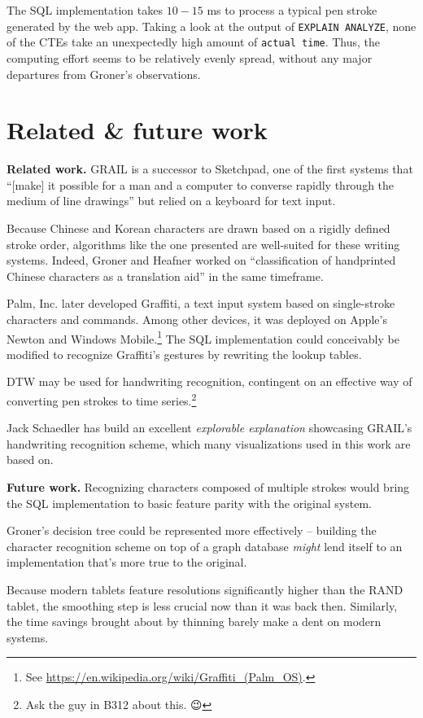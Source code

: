 \documentclass[sigconf]{acmart}
\begin{document}
The SQL implementation takes $10-15$ ms to process a typical pen stroke generated by the web app. Taking a look at the output of \texttt{EXPLAIN ANALYZE}, none of the CTEs take an unexpectedly high amount of \texttt{actual time}. Thus, the computing effort seems to be relatively evenly spread, without any major departures from Groner's observations.

\section{Related \& future work}

\textbf{Related work.} GRAIL is a successor to Sketchpad, one of the first systems that \enquote{[make] it possible for a man and a computer to converse rapidly through the medium of line drawings} but relied on a keyboard for text input. \cite{sketchpad}

Because Chinese and Korean characters are drawn based on a rigidly defined stroke order, algorithms like the one presented are well-suited for these writing systems. Indeed, Groner and Heafner worked on \enquote{classification of handprinted Chinese characters as a translation aid} \cite{chinese} in the same timeframe.

Palm, Inc. later developed Graffiti, a text input system based on single-stroke characters and commands. Among other devices, it was deployed on Apple's Newton and Windows Mobile.\footnote{See \url{https://en.wikipedia.org/wiki/Graffiti_(Palm_OS)}.} The SQL implementation could conceivably be modified to recognize Graffiti's gestures by rewriting the lookup tables.

DTW may be used for handwriting recognition, contingent on an effective way of converting pen strokes to time series.\footnote{Ask the guy in B312 about this. {\emoji 😉}}

Jack Schaedler has build an excellent \textit{explorable explanation} \cite{schaedler} showcasing GRAIL's handwriting recognition scheme, which many visualizations used in this work are based on.

\textbf{Future work.} Recognizing characters composed of multiple strokes would bring the SQL implementation to basic feature parity with the original system.

Groner's decision tree could be represented more effectively – building the character recognition scheme on top of a graph database \textit{might} lend itself to an implementation that's more true to the original.

Because modern tablets feature resolutions significantly higher than the RAND tablet, the smoothing step is less crucial now than it was back then. Similarly, the time savings brought about by thinning barely make a dent on modern systems.



\end{document}
